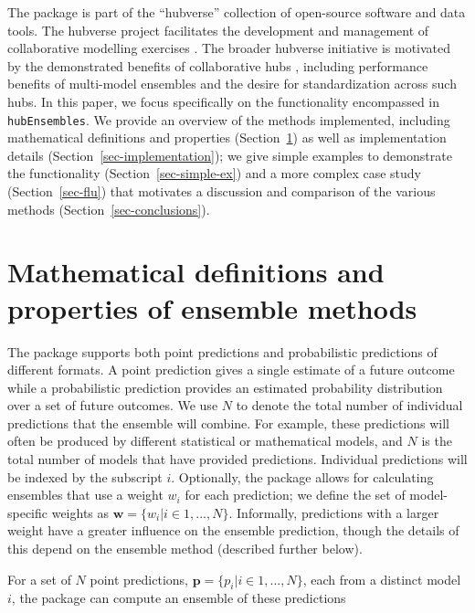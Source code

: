 \documentclass[
  article,
  shortnames,
  notitle]{jss}
\begin{document}
The  package is part of the ``hubverse'' collection of
open-source software and data tools. The hubverse project facilitates
the development and management of collaborative modelling exercises
\citep{hubverse_docs}. The broader hubverse initiative is motivated by
the demonstrated benefits of collaborative hubs
\citep{reich2022, borchering_public_2023}, including performance
benefits of multi-model ensembles and the desire for standardization
across such hubs. In this paper, we focus specifically on the
functionality encompassed in \texttt{hubEnsembles}. We provide an
overview of the methods implemented, including mathematical definitions
and properties (Section~\ref{sec-defs}) as well as implementation
details (Section~\ref{sec-implementation}); we give simple examples to
demonstrate the functionality (Section~\ref{sec-simple-ex}) and a more
complex case study (Section~\ref{sec-flu}) that motivates a discussion
and comparison of the various methods (Section~\ref{sec-conclusions}).

\section{Mathematical definitions and properties of ensemble
methods}\label{sec-defs}

The  package supports both point predictions and
probabilistic predictions of different formats. A point prediction gives
a single estimate of a future outcome while a probabilistic prediction
provides an estimated probability distribution over a set of future
outcomes. We use \(N\) to denote the total number of individual
predictions that the ensemble will combine. For example, these
predictions will often be produced by different statistical or
mathematical models, and \(N\) is the total number of models that have
provided predictions. Individual predictions will be indexed by the
subscript \(i\). Optionally, the package allows for calculating
ensembles that use a weight \(w_i\) for each prediction; we define the
set of model-specific weights as
\(\pmb{w} = \{w_i | i \in 1, ..., N\}\). Informally, predictions with a
larger weight have a greater influence on the ensemble prediction,
though the details of this depend on the ensemble method (described
further below).

For a set of \(N\) point predictions,
\(\pmb{p} = \{p_i|i \in 1, ..., N\}\), each from a distinct model \(i\),
the  package can compute an ensemble of these
predictions
\end{document}
